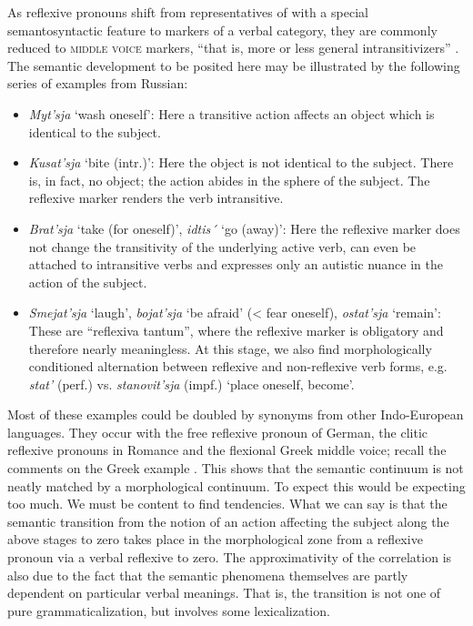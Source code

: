 As reflexive pronouns shift from representatives of \nps with a special semantosyntactic feature to markers of a verbal category, they are commonly reduced to \textsc{middle voice} markers, “that is, more or less general intransitivizers” \citep[268f]{Faltz1977}. The semantic development to be posited here may be illustrated by the following series of examples from Russian:

\begin{itemize}

\item[] \textit{Myt'sja} ‘wash oneself’: Here a transitive action affects an object which is identical to the subject.

\item[] \textit{Kusat'sja} ‘bite (intr.)’: Here the object is not identical to the subject. There is, in fact, no object; the action abides in the sphere of the subject. The reflexive marker renders the verb intransitive.

\item[] \textit{Brat'sja} ‘take (for oneself)’, \textit{idtis´} ‘go (away)’: Here the reflexive marker does not change the transitivity of the underlying active verb, can even be attached to intransitive verbs and expresses only an autistic nuance in the action of the subject.

\item[] \textit{Smejat'sja} ‘laugh’, \textit{bojat'sja} ‘be afraid’ ({\textless} fear oneself), \textit{ostat'sja} ‘remain’: These are ``reflexiva tantum'', where the reflexive marker is obligatory and therefore nearly meaningless. At this stage, we also find morphologically conditioned alternation between reflexive and non-reflexive verb forms, e.g. \textit{stat'} (perf.) vs. \textit{stanovit'sja} (impf.) ‘place oneself, become’.

\end{itemize}

\noindent Most of these examples could be doubled by synonyms from other Indo-European languages. They occur with the free reflexive pronoun of German, the clitic reflexive pronouns in Romance and the flexional Greek middle voice; recall the comments on the Greek example . This shows that the semantic continuum is not neatly matched by a morphological continuum. To expect this would be expecting too much. We must be content to find tendencies. What we can say is that the semantic transition from the notion of an action affecting the subject along the above stages to zero takes place in the morphological zone from a reflexive pronoun via a verbal reflexive to zero. The approximativity of the correlation is also due to the fact that the semantic phenomena themselves are partly dependent on particular verbal meanings. That is, the transition is not one of pure grammaticalization, but involves some lexicalization.

